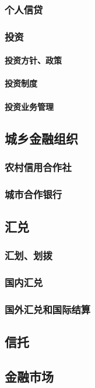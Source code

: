 \documentclass[UTF8]{../../RepresentationUniverse}
\begin{document}
        \subsubsection{个人信贷}
        \subsubsection{投资}
            \paragraph{投资方针、政策}
            \paragraph{投资制度}
            \paragraph{投资业务管理}
    \subsection{城乡金融组织}
        \subsubsection{农村信用合作社}
        \subsubsection{城市合作银行}
    \subsection{汇兑}
        \subsubsection{汇划、划拨}
        \subsubsection{国内汇兑}
        \subsubsection{国外汇兑和国际结算}
    \subsection{信托}
    \subsection{金融市场}
\end{document}
